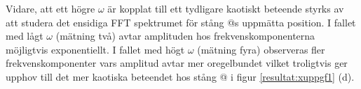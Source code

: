 \documentclass[12pt,a4paper]{article}
\makeatletter
\newlength\fheight
\newcommand*{\rom}[1]{\expandafter\@slowromancap\romannumeral #1@}
\makeatother
\begin{document}
%        
%        



Vidare, att ett högre $\omega$ är kopplat till ett tydligare kaotiskt beteende styrks av att studera det ensidiga FFT spektrumet för stång \rom{2}s uppmätta position. I fallet med lågt $\omega$ (mätning två) avtar amplituden hos frekvenskomponenterna möjligtvis exponentiellt. I fallet med högt $\omega$ (mätning fyra) observeras fler frekvenskomponenter vars amplitud avtar mer oregelbundet vilket troligtvis ger upphov till det mer kaotiska beteendet hos stång \rom{2} i figur \ref{resultat:xuppgf1} (d).

\end{document}
